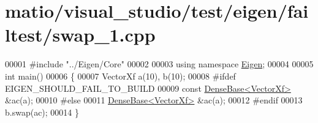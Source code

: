 \hypertarget{matio_2visual__studio_2test_2eigen_2failtest_2swap__1_8cpp_source}{}\section{matio/visual\+\_\+studio/test/eigen/failtest/swap\+\_\+1.cpp}
\label{matio_2visual__studio_2test_2eigen_2failtest_2swap__1_8cpp_source}

\begin{DoxyCode}
00001 \textcolor{preprocessor}{#include "../Eigen/Core"}
00002 
00003 \textcolor{keyword}{using namespace }\hyperlink{namespace_eigen}{Eigen};
00004 
00005 \textcolor{keywordtype}{int} main()
00006 \{
00007   VectorXf a(10), b(10);
00008 \textcolor{preprocessor}{#ifdef EIGEN\_SHOULD\_FAIL\_TO\_BUILD}
00009   \textcolor{keyword}{const} \hyperlink{group___core___module_class_eigen_1_1_dense_base}{DenseBase<VectorXf>} &ac(a);
00010 \textcolor{preprocessor}{#else}
00011   \hyperlink{group___core___module_class_eigen_1_1_dense_base}{DenseBase<VectorXf>} &ac(a);
00012 \textcolor{preprocessor}{#endif}
00013   b.swap(ac);
00014 \}
\end{DoxyCode}
